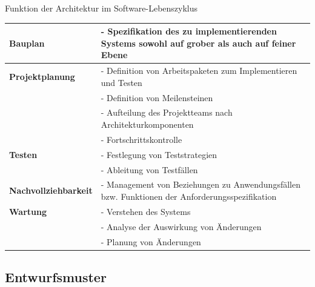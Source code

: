 \begin{bonus}{Funktion der Architektur im Software-Lebenszyklus}
    \begin{tabularx}{\textwidth}{|>{\bfseries}l|>{- }X|}
        \hline
        Bauplan             & Spezifikation des zu implementierenden Systems sowohl auf grober als auch auf feiner Ebene   \\
        \hline
        Projektplanung      & Definition von Arbeitspaketen zum Implementieren und Testen                                  \\
                            & Definition von Meilensteinen                                                                 \\
                            & Aufteilung des Projektteams nach Architekturkomponenten                                      \\
                            & Fortschrittskontrolle                                                                        \\
        \hline
        Testen              & Festlegung von Teststrategien                                                                \\
                            & Ableitung von Testfällen                                                                     \\
        \hline
        Nachvollziehbarkeit & Management von Beziehungen zu Anwendungsfällen bzw. Funktionen der Anforderungsspezifikation \\
        \hline
        Wartung             & Verstehen des Systems                                                                        \\
                            & Analyse der Auswirkung von Änderungen                                                        \\
                            & Planung von Änderungen                                                                       \\
        \hline
    \end{tabularx}
\end{bonus}

\subsection{Entwurfsmuster}

